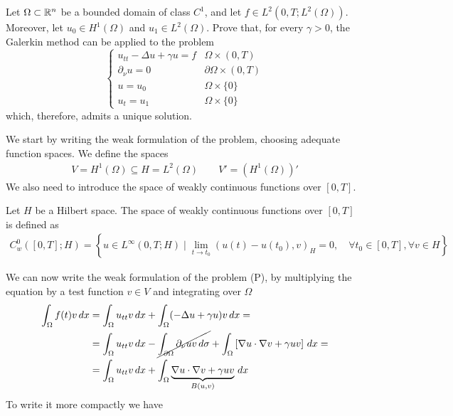 \newpage
\begin{exercise}
    Let \(\Omega \subset \mathbb{R}^n\) be a bounded domain of class \(C^1\), and let \(f \in L^2(0, T; L^2(\Omega))\). Moreover, let \(u_0 \in H^1(\Omega)\) and \(u_1 \in L^2(\Omega)\). Prove that, for every \(\gamma > 0\), the Galerkin method can be applied to the problem
    \[
        \begin{cases}
            u_{tt} - \Delta u + \gamma u = f & \Omega \times (0, T) \\
            \partial_\nu u = 0 & \partial\Omega \times (0, T) \\
            u = u_0 & \Omega \times \{0\} \\
            u_t = u_1 & \Omega \times \{0\}
        \end{cases}
        \tag*{(P)}
    \]
    which, therefore, admits a unique solution.
\end{exercise}
We start by writing the weak formulation of the problem, choosing adequate function spaces. We define the spaces
\[
    \begin{split}
        V = H^1(\Omega) \subseteq H = L^2(\Omega) \qquad V' = \left(H^1(\Omega)\right)'
    \end{split}
\]
We also need to introduce the space of weakly continuous functions over \([0, T]\).
\begin{remark}
    Let \(H\) be a Hilbert space. The space of weakly continuous functions over \([0, T]\) is defined as
    \[
        \begin{split}
            C_w^0([0, T]; H) = \left\{ u \in L^\infty(0, T; H) \mid \lim_{t \to t_0} (u(t) - u(t_0), v)_H = 0, \quad \forall t_0 \in [0, T], \forall v \in H \right\}
        \end{split}
    \] 
\end{remark}
We can now write the weak formulation of the problem (P), by multiplying the equation by a test function \(v \in V\) and integrating over \(\Omega\)
\begin{align*}
    \int_\Omega f(t) v \, dx &= \int_\Omega u_{tt} v \, dx + \int_\Omega (-\Delta u  + \gamma u)v \, dx =\\
    &= \int_\Omega u_{tt} v \, dx - \cancel{\int_{\partial\Omega} \partial_\nu u v \, d\sigma} + \int_\Omega \left[\nabla u \cdot \nabla v + \gamma u v\right] \, dx = \\
    &= \int_\Omega u_{tt} v \, dx + \int_\Omega \underbrace{\nabla u \cdot \nabla v + \gamma u v}_{B(u, v)} \, dx
\end{align*}
To write it more compactly we have 
